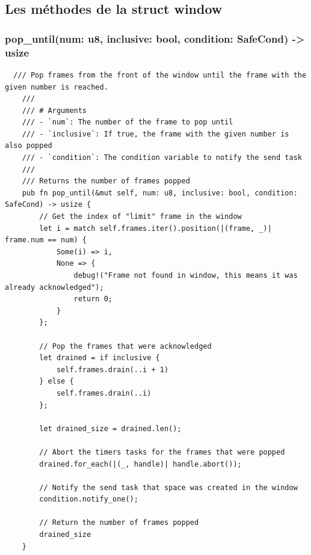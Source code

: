 \documentclass[french]{article}
\begin{document}
  \subsection{Les méthodes de la struct window} 
  \subsubsection{pop\_until(num: u8, inclusive: bool, condition: SafeCond) ->
  usize} 

  \begin{lstlisting}
  /// Pop frames from the front of the window until the frame with the given number is reached.
    ///
    /// # Arguments
    /// - `num`: The number of the frame to pop until
    /// - `inclusive`: If true, the frame with the given number is also popped
    /// - `condition`: The condition variable to notify the send task
    ///
    /// Returns the number of frames popped
    pub fn pop_until(&mut self, num: u8, inclusive: bool, condition: SafeCond) -> usize {
        // Get the index of "limit" frame in the window
        let i = match self.frames.iter().position(|(frame, _)| frame.num == num) {
            Some(i) => i,
            None => {
                debug!("Frame not found in window, this means it was already acknowledged");
                return 0;
            }
        };

        // Pop the frames that were acknowledged
        let drained = if inclusive {
            self.frames.drain(..i + 1)
        } else {
            self.frames.drain(..i)
        };

        let drained_size = drained.len();

        // Abort the timers tasks for the frames that were popped
        drained.for_each(|(_, handle)| handle.abort());

        // Notify the send task that space was created in the window
        condition.notify_one();

        // Return the number of frames popped
        drained_size
    }
  \end{lstlisting}
  
\end{document}
